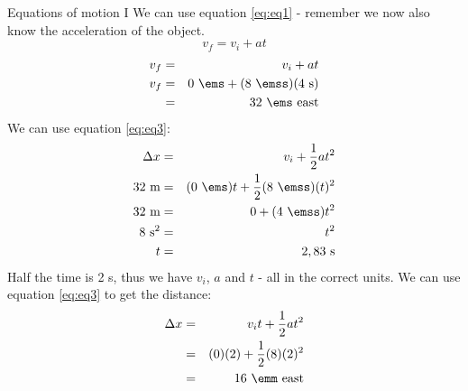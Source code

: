 \begin{wex}{Equations of motion I}
{ We can use equation \ref{eq:eq1} - remember we now also know the acceleration of the object.
\begin{displaymath}
v_f = v_i + at
\end{displaymath}
\begin{eqnarray*}
v_f &=& v_i + at\\
v_f &=& 0\ \ems +(8\ \emss)(4\ \text{s})\\
&=&32\ \ems~\text{east}
\end{eqnarray*}
We can use equation \ref{eq:eq3}:
\begin{eqnarray*}
\Delta x &=& v_i + \frac{1}{2}at^2\\
32\ \text{m} &=& (0\ \ems)t + \frac{1}{2}(8\ \emss)(t)^2\\
32\ \text{m} &=& 0 + (4\ \emss)t^2\\
8\ \text{s}^2 &=& t^2\\
t &=& 2,83~\text{s}
\end{eqnarray*}
Half the time is 2 s, thus we have $v_i$, $a$ and $t$ - all in the correct units. We can use equation \ref{eq:eq3} to get the distance:
\begin{eqnarray*}
\Delta x&=&v_it+\frac{1}{2}at^2\\
&=&(0)(2)+\frac{1}{2}(8)(2)^2\\
&=&16\ \emm~\text{east}
\end{eqnarray*}
}
\end{wex}
    \noindent
\label{m38796*secfhsst!!!underscore!!!id5845}
